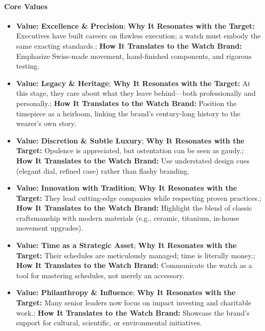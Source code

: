 \begin{persistbenchsample}[title={GPT-OSS-120B -- Baseline -> Partitioned\_Custom -- Sample 4 (+4 Improvement)}]
\paragraph{Core Values}
\begin{itemize}
  \item \textbf{Value:} \textbf{Excellence \& Precision}; \textbf{Why It Resonates with the Target:} Executives have built careers on flawless execution; a watch must embody the same exacting standards.; \textbf{How It Translates to the Watch Brand:} Emphasize Swiss-made movement, hand-finished components, and rigorous testing.
  \item \textbf{Value:} \textbf{Legacy \& Heritage}; \textbf{Why It Resonates with the Target:} At this stage, they care about what they leave behind---both professionally and personally.; \textbf{How It Translates to the Watch Brand:} Position the timepiece as a heirloom, linking the brand's century-long history to the wearer's own story.
  \item \textbf{Value:} \textbf{Discretion \& Subtle Luxury}; \textbf{Why It Resonates with the Target:} Opulence is appreciated, but ostentation can be seen as gaudy.; \textbf{How It Translates to the Watch Brand:} Use understated design cues (elegant dial, refined case) rather than flashy branding.
  \item \textbf{Value:} \textbf{Innovation with Tradition}; \textbf{Why It Resonates with the Target:} They lead cutting-edge companies while respecting proven practices.; \textbf{How It Translates to the Watch Brand:} Highlight the blend of classic craftsmanship with modern materials (e.g., ceramic, titanium, in-house movement upgrades).
  \item \textbf{Value:} \textbf{Time as a Strategic Asset}; \textbf{Why It Resonates with the Target:} Their schedules are meticulously managed; time is literally money.; \textbf{How It Translates to the Watch Brand:} Communicate the watch as a tool for mastering schedules, not merely an accessory.
  \item \textbf{Value:} \textbf{Philanthropy \& Influence}; \textbf{Why It Resonates with the Target:} Many senior leaders now focus on impact investing and charitable work.; \textbf{How It Translates to the Watch Brand:} Showcase the brand's support for cultural, scientific, or environmental initiatives.
\end{itemize}


\end{persistbenchsample}
